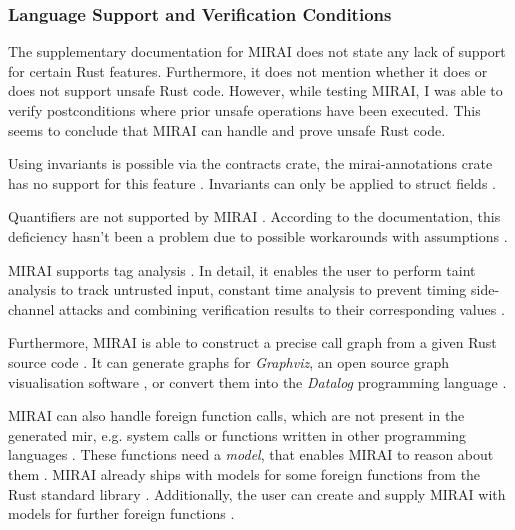 \subsubsection{Language Support and Verification Conditions}
The supplementary documentation for MIRAI does not state any lack of support for certain Rust features. Furthermore, it does not mention whether it does or does not support unsafe Rust code. However, while testing MIRAI, I was able to verify postconditions where prior unsafe operations have been executed. This seems to conclude that MIRAI can handle and prove unsafe Rust code.  

Using invariants is possible via the contracts crate, the mirai-annotations crate has no support for this feature \cite{facebookexperimental_miraidocumentationoverviewmd_2021}. Invariants can only be applied to struct fields \cite{facebookexperimental_miraidocumentationoverviewmd_2021}.

Quantifiers are not supported by MIRAI \cite{facebookexperimental_miraidocumentationoverviewmd_2021}. According to the documentation, this deficiency hasn't been a problem due to possible workarounds with assumptions \cite{facebookexperimental_miraidocumentationoverviewmd_2021}.

MIRAI supports tag analysis \cite{facebookexperimental_miraidocumentationtaganalysismd_2021}. In detail, it enables the user to perform taint analysis to track untrusted input, constant time analysis to prevent timing side-channel attacks and combining verification results to their corresponding values \cite{facebookexperimental_miraidocumentationoverviewmd_2021, facebookexperimental_miraidocumentationtaganalysismd_2021}.

Furthermore, MIRAI is able to construct a precise call graph from a given Rust source code \cite{facebookexperimental_miraidocumentationcallgraphmd_2022}. It can generate graphs for \textit{Graphviz}, an open source graph visualisation software \cite{graphviz_graphviz_2023}, or convert them into the \textit{Datalog} programming language \cite{facebookexperimental_miraidocumentationcallgraphmd_2022}.

MIRAI can also handle foreign function calls, which are not present in the generated \acs{mir}, e.g. system calls or functions written in other programming languages \cite{facebookexperimental_miraidocumentationoverviewmd_2021}. These functions need a \textit{model}, that enables MIRAI to reason about them \cite{facebookexperimental_miraidocumentationoverviewmd_2021}. MIRAI already ships with models for some foreign functions from the Rust standard library \cite{facebookexperimental_miraidocumentationoverviewmd_2021}. Additionally, the user can create and supply MIRAI with  models for further foreign functions \cite{facebookexperimental_miraidocumentationoverviewmd_2021}.

